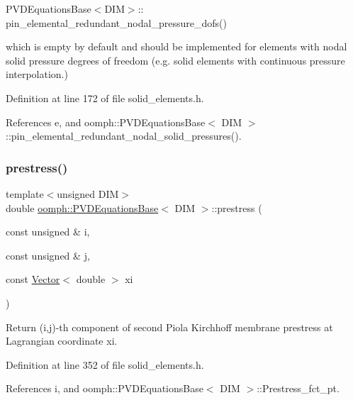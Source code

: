 \begin{DoxyItemize}
\item {\ttfamily P\+V\+D\+Equations\+Base$<$\+D\+I\+M$>$}\+:\+: pin\+\_\+elemental\+\_\+redundant\+\_\+nodal\+\_\+pressure\+\_\+dofs()
\end{DoxyItemize}which is empty by default and should be implemented for elements with nodal solid pressure degrees of freedom (e.\+g. solid elements with continuous pressure interpolation.) 

Definition at line 172 of file solid\+\_\+elements.\+h.



References e, and oomph\+::\+P\+V\+D\+Equations\+Base$<$ D\+I\+M $>$\+::pin\+\_\+elemental\+\_\+redundant\+\_\+nodal\+\_\+solid\+\_\+pressures().

\mbox{\label{classoomph_1_1PVDEquationsBase_a4e3c80ea73dca7695dadc78fad7825f9}} 
\subsubsection{\texorpdfstring{prestress()}{prestress()}}
{\footnotesize\ttfamily template$<$unsigned D\+IM$>$ \\
double \hyperlink{classoomph_1_1PVDEquationsBase}{oomph\+::\+P\+V\+D\+Equations\+Base}$<$ D\+IM $>$\+::prestress (\begin{DoxyParamCaption}\item[{const unsigned \&}]{i,  }\item[{const unsigned \&}]{j,  }\item[{const \hyperlink{classoomph_1_1Vector}{Vector}$<$ double $>$}]{xi }\end{DoxyParamCaption})\hspace{0.3cm}{\ttfamily [inline]}}



Return (i,j)-\/th component of second Piola Kirchhoff membrane prestress at Lagrangian coordinate xi. 



Definition at line 352 of file solid\+\_\+elements.\+h.



References i, and oomph\+::\+P\+V\+D\+Equations\+Base$<$ D\+I\+M $>$\+::\+Prestress\+\_\+fct\+\_\+pt.

